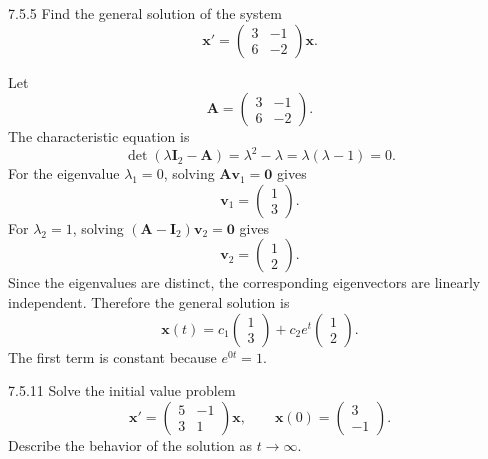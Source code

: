 \documentclass[11pt,oneside]{article}
\begin{document}

\begin{problem}{7.5.5}
Find the general solution of the system
\[
    \mathbf{x}'=
    \begin{pmatrix}
        3 & -1\\
        6 & -2
    \end{pmatrix}\mathbf{x}.
\]
\end{problem}

\begin{solution}
Let
\[
    \mathbf{A}=\begin{pmatrix}3&-1\\6&-2\end{pmatrix}.
\]
The characteristic equation is
\[
    \det(\lambda\mathbf{I}_2-\mathbf{A})
    =\lambda^2-\lambda=\lambda(\lambda-1)=0.
\]
For the eigenvalue $\lambda_1=0$, solving $\mathbf{A}\mathbf{v}_1=\mathbf{0}$ gives
\[
    \mathbf{v}_1=\begin{pmatrix}1\\3\end{pmatrix}.
\]
For $\lambda_2=1$, solving $(\mathbf{A}-\mathbf{I}_2)\mathbf{v}_2=\mathbf{0}$ gives
\[
    \mathbf{v}_2=\begin{pmatrix}1\\2\end{pmatrix}.
\]
Since the eigenvalues are distinct, the corresponding eigenvectors are linearly independent. Therefore the general solution is
\[
    \boxed{
        \mathbf{x}(t)
        =c_1\begin{pmatrix}1\\3\end{pmatrix}
        +c_2e^t\begin{pmatrix}1\\2\end{pmatrix}
    }.
\]
The first term is constant because $e^{0t}=1$.
\end{solution}

\begin{problem}{7.5.11}
Solve the initial value problem
\[
    \mathbf{x}'=
    \begin{pmatrix}
        5&-1\\
        3&1
    \end{pmatrix}\mathbf{x},
    \qquad
    \mathbf{x}(0)=\begin{pmatrix}3\\-1\end{pmatrix}.
\]
Describe the behavior of the solution as $t\to\infty$.
\end{problem}
\end{document}
